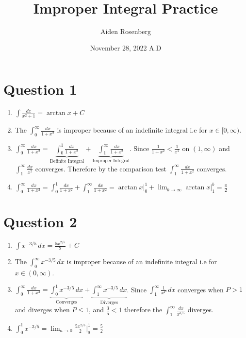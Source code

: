 \documentclass[12pt]{article}
\title{Improper Integral Practice
}
\author{Aiden Rosenberg}
\date{November 28, 2022 A.D}
\begin{document}
\maketitle
    \section*{Question 1}
\begin{enumerate}[label=\Alph*.]
	\item \(\int \frac{dx}{x^2+1} = \arctan x + C \)
	\item The \(\int_{0}^{\infty} \frac{dx}{1+x^2}\) is improper because of an indefinite integral i.e for \( x\in[0,\infty) \).
		\item \(\int_{0}^{\infty} \frac{dx}{1+x^2}  =\underbrace{\int_{0}^{1} \frac{dx}{1+x^2}}_{\text{Definite Integral}} + \underbrace{\int_{1}^{\infty} \frac{dx}{1+x^2}}_{\text{Improper Integral}}\). Since \(\frac{1}{1+x^2} < \frac{1}{x^2}\) on $(1,\infty)$ and $\int_{1}^{\infty} \frac{dx}{x^2}$ converges. Therefore by the comparison test $\int_{1}^{\infty} \frac{dx}{1+x^2}$ converges. 
		\item $\int_{0}^{\infty} \frac{dx}{1+x^2}  =\int_{0}^{1} \frac{dx}{1+x^2} + \int_{1}^{\infty} \frac{dx}{1+x^2} = \arctan x \biggr\rvert_{0}^{1} + \lim_{b \to \infty} \arctan x \biggr\rvert_{1}^{b} = \boxed{\frac{\pi}{2}}$
		\end{enumerate}
    \section*{Question 2}
		\begin{enumerate}
			\item $\int x^{-3/5} \, dx  = \frac{5x^{2/5}}{2} + C $
			\item The $\int_{0}^{\infty} x^{-3/5} \, dx $ is improper because of an indefinite integral i.e for \( x\in(0,\infty) \). 
			\item \(\int_{0}^{\infty} \frac{dx}{1+x^2}  =\underbrace{\int_{0}^{1} x^{-3/5} \, dx }_{\text{Converges}} + \underbrace{\int_{1}^{\infty} x^{-3/5} \, dx}_{\text{Diverges}}\). Since $\int_{1}^{\infty }\frac{1}{x^P} \, dx$ converges when $P > 1$ and diverges when $P \leq 1$, and $\frac{3}{5} < 1$ therefore the $\int_{1}^{\infty} \frac{dx}{x^{3/5}}$ diverges. 
			\item $\int_{0}^{1} x^{-3/5} = \lim_{a\to 0} \frac{5x^{2/5}}{2} \biggr\rvert_{a}^{1} = \boxed{\frac{5}{2}}$
		\end{enumerate}
\end{document}
